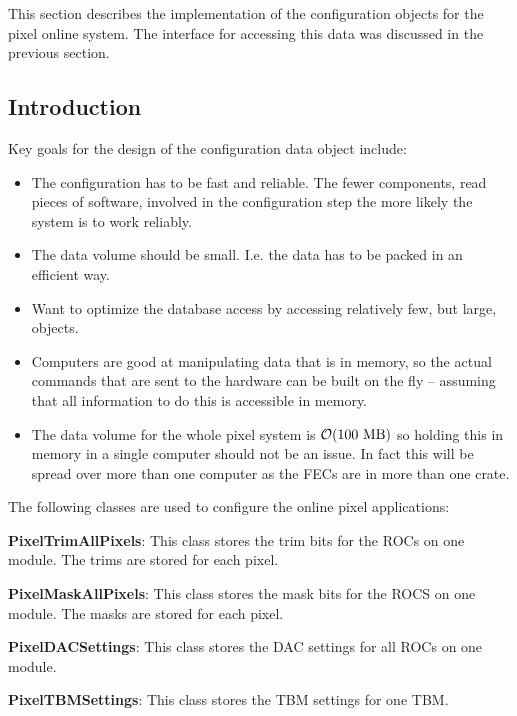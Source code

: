 
This section describes the implementation
of the configuration objects for the 
pixel online system. The interface for accessing this data 
was discussed in the previous section. 

\subsection{Introduction}

Key goals for the design of the configuration
data object include:
\begin{itemize}
\item The configuration has to be fast and reliable.
      The fewer components, read pieces of software, 
      involved in the configuration step the more
      likely the system is to work reliably.
\item The data volume should be small. I.e. the data
      has to be packed in an efficient way.
\item Want to optimize the database access by accessing
      relatively few, but large, objects. 
\item Computers are good at manipulating data that is in
      memory, so the actual commands that are sent to 
      the hardware can be built on the fly -- assuming that
      all information to do this is accessible in memory.
\item The data volume for the whole pixel system is ${\cal O}(100\ {\rm MB})$
      so holding this in memory in a single computer should
      not be an issue. In fact this will be spread over
      more than one computer as the FECs are in more than
      one crate.
\end{itemize}

The following classes are used to configure the online pixel
applications:

\vskip 0.5cm
\noindent
{\bf PixelTrimAllPixels}: This class stores the trim bits for the
                          ROCs on one module. The trims are stored
                          for each pixel.

\vskip 0.5cm
\noindent
{\bf PixelMaskAllPixels}: This class stores the mask bits for the
                          ROCS on one module. The masks are stored
                          for each pixel.

\vskip 0.5cm
\noindent
{\bf PixelDACSettings}: This class stores the DAC settings for all
                        ROCs on one module. 

\vskip 0.5cm
\noindent
{\bf PixelTBMSettings}: This class stores the TBM settings for one
                        TBM.

